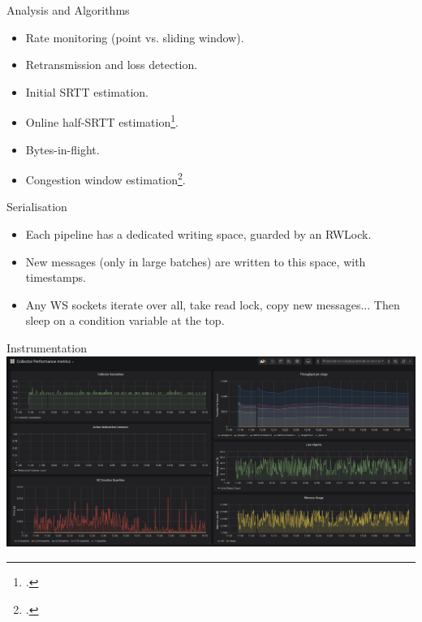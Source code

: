 \documentclass[aspectratio=169,xcolor={dvipsnames}
]{beamer}
\begin{document}

\begin{frame}{Analysis and Algorithms}
	\begin{itemize}[<+- | alert@+>]
		\item Rate monitoring (point vs. sliding window).
		\item Retransmission and loss detection.
		\item Initial SRTT estimation.
		\item Online half-SRTT estimation\footcite{DBLP:journals/ccr/KarnP87}.
		\item Bytes-in-flight.
		\item Congestion window estimation\footcite{DBLP:conf/sosr/GhasemiBR17}.
	\end{itemize}
\end{frame}


\begin{frame}{Serialisation}
	\begin{itemize}[<+- | alert@+>]
		\item Each pipeline has a dedicated writing space, guarded by an RWLock.
		\item New messages (only in large batches) are written to this space, with timestamps.
		\item Any WS sockets iterate over all, take read lock, copy new messages... \alert{Then sleep on a condition variable at the top}.
	\end{itemize}
\end{frame}


\begin{frame}{Instrumentation}
	\includegraphics[width=\linewidth]{telemetry}
\end{frame}
\end{document}
